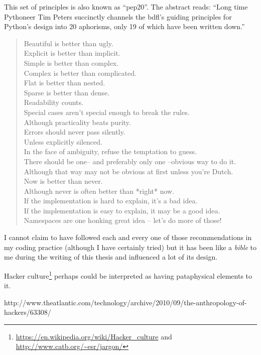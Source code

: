 This set of principles is also known as ``\acrshort{pep}20''. The abstract reads: ``Long time Pythoneer Tim Peters succinctly channels the \acrshort{bdfl}'s guiding principles for Python's design into 20 aphorisms, only 19 of which have been written down.'' \citeyear{PEP20}

\begin{quotation}
  Beautiful is better than ugly.\\
  Explicit is better than implicit.\\
  Simple is better than complex.\\
  Complex is better than complicated.\\
  Flat is better than nested.\\
  Sparse is better than dense.\\
  Readability counts.\\
  Special cases aren't special enough to break the rules.\\
  Although practicality beats purity.\\
  Errors should never pass silently.\\
  Unless explicitly silenced.\\
  In the face of ambiguity, refuse the temptation to guess.\\
  There should be one-- and preferably only one --obvious way to do it.\\
  Although that way may not be obvious at first unless you're Dutch.\\
  Now is better than never.\\
  Although never is often better than *right* now.\\
  If the implementation is hard to explain, it's a bad idea.\\
  If the implementation is easy to explain, it may be a good idea.\\
  Namespaces are one honking great idea -- let's do more of those!
\end{quotation}

I cannot claim to have followed each and every one of those recommendations in my coding practice (although I have certainly tried) but it has been like a \textit{bible} to me during the writing of this thesis and influenced a lot of its design.

Hacker culture\footnote{\url{https://en.wikipedia.org/wiki/Hacker_culture} and \url{http://www.catb.org/~esr/jargon/}} perhaps could be interpreted as having pataphysical elements to it.

http://www.theatlantic.com/technology/archive/2010/09/the-anthropology-of-hackers/63308/


\stopcontents[chapters]

